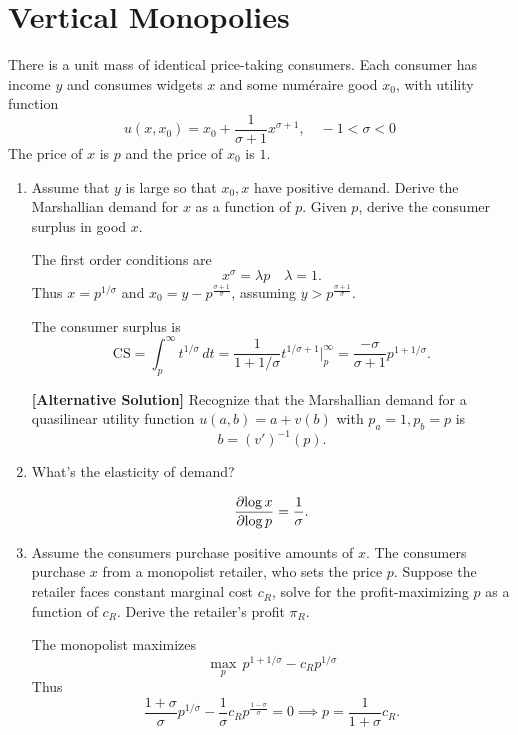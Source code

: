 \documentclass[11pt]{article}
\begin{document}
\section{Vertical Monopolies}
There is a unit mass of identical price-taking consumers. Each consumer has income $y$ and consumes widgets $x$ and some num\'eraire good $x_0$, with utility function \[
u(x, x_0) = x_0 + \frac{1}{\sigma+1} x^{\sigma+1}, \quad -1 < \sigma < 0
\]
The price of $x$ is $p$ and the price of $x_0$ is $1$.
\begin{enumerate}
    \item Assume that $y$ is large so that $x_0, x$ have positive demand. Derive the Marshallian demand for $x$ as a function of $p$. Given $p$, derive the consumer surplus in good $x$.
    \begin{sol}
        The first order conditions are \[
        x^{\sigma} = \lambda p \quad \lambda = 1.
        \]
        Thus $x = p^{1/\sigma}$ and $x_0 = y - p^{\frac{\sigma + 1}{\sigma}}$, assuming $y > p^{\frac{\sigma + 1}{\sigma}}$. 
        
        The consumer surplus is \[
        \text{CS} = \int_{p}^{\infty} t^{1/\sigma}\,dt = \frac{1}{1+1/\sigma}t^{1/\sigma + 1}\Bigg \rvert_{p}^\infty = \frac{-\sigma}{\sigma + 1} p^{1 + 1/\sigma}.
        \]
    \end{sol}
    
     \begin{sol}\textbf{[Alternative Solution]}
          Recognize that the Marshallian demand for a quasilinear utility function $u(a,b) = a + v(b)$ with $p_a=1, p_b=p$ is \[b = (v')^{-1}(p).\]
              \end{sol} 
    \item What's the elasticity of demand?
    \begin{sol}
        \[
        \frac{\partial{\log x}}{\partial{ \log p}} = \frac{1}{\sigma}. 
        \]
    \end{sol}
    \item 
    Assume the consumers purchase positive amounts of $x$.
    The consumers purchase $x$ from a monopolist retailer, who sets the price $p$. Suppose the retailer faces constant marginal cost $c_R$, solve for the profit-maximizing $p$ as a function of $c_R$. Derive the retailer's profit $\pi_R$. 
    \begin{sol}
         The monopolist maximizes \[
         \max_p \, p^{1+1/\sigma} - c_R p^{1/\sigma} 
         \]
         Thus \[
         \frac{1+\sigma}{\sigma} p^{1/\sigma} - \frac{1}{\sigma}c_R p^{\frac{1-\sigma}{\sigma}} = 0 \implies p = \frac{1}{1+\sigma} c_R. 
         \]
         

\end{sol}
\end{enumerate}
\end{document}
